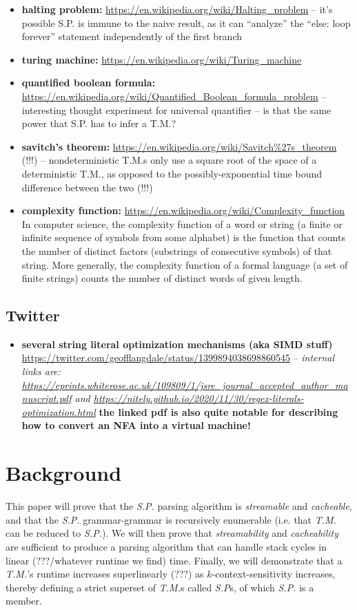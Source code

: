 \documentclass{article}
\begin{document}
\begin{itemize}
  \item \textbf{halting problem:} \url{https://en.wikipedia.org/wiki/Halting\_problem} -- it's possible S.P. is immune to the naive result, as it can ``analyze'' the ``else: loop forever'' statement independently of the first branch
  \item \textbf{turing machine:} \url{https://en.wikipedia.org/wiki/Turing\_machine}
  \item \textbf{quantified boolean formula:} \url{https://en.wikipedia.org/wiki/Quantified\_Boolean\_formula\_problem} -- interesting thought experiment for universal quantifier -- is that the same power that S.P. has to infer a T.M.?
  \item \textbf{savitch's theorem:} \url{https://en.wikipedia.org/wiki/Savitch\%27s\_theorem} (!!!) -- nondeterministic T.M.s only use a square root of the space of a deterministic T.M., as opposed to the possibly-exponential time bound difference between the two (!!!)
  \item \textbf{complexity function:} \url{https://en.wikipedia.org/wiki/Complexity_function} In computer science, the complexity function of a word or string (a finite or infinite sequence of symbols from some alphabet) is the function that counts the number of distinct factors (substrings of consecutive symbols) of that string. More generally, the complexity function of a formal language (a set of finite strings) counts the number of distinct words of given length.
\end{itemize}

\subsection{Twitter}
\begin{itemize}
  \item \textbf{several string literal optimization mechanisms (aka SIMD stuff)} \url{https://twitter.com/geofflangdale/status/1399894038698860545} -- \textit{internal links are: \url{https://eprints.whiterose.ac.uk/109809/1/jsre_journal_accepted_author_manuscript.pdf} and \url{https://nitely.github.io/2020/11/30/regex-literals-optimization.html}} \textbf{the linked pdf is also quite notable for describing how to convert an NFA into a virtual machine!}
\end{itemize}

\section{Background}
This paper will prove that the \textit{S.P.} parsing algorithm is \textit{streamable} and \textit{cacheable}, and that the \textit{S.P.} grammar-grammar is recursively enumerable (i.e. that \textit{T.M.} can be reduced to \textit{S.P.}). We will then prove that \textit{streamability} and \textit{cacheability} are sufficient to produce a parsing algorithm that can handle stack cycles in linear (???/whatever runtime we find) time. Finally, we will demonstrate that a \textit{T.M.}'s runtime increases superlinearly (???) as $k$-context-sensitivity increases, thereby defining a strict superset of \textit{T.M.}s called \textit{S.P}s, of which \textit{S.P.} is a member.
\end{document}
